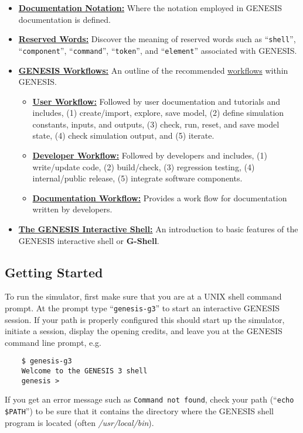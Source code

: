 \documentclass[12pt]{article}
\begin{document}
\begin{itemize}

\item \href{../document-notation/document-notation.tex}{\bf Documentation Notation:} Where the notation employed in GENESIS documentation is defined.

\item \href{../reserved-words/reserved-words.tex}{\bf Reserved Words:} Discover the meaning of reserved words such as ``{\tt shell}'', ``{\tt component}'', ``{\tt command}'', ``{\tt token}'', and ``{\tt element}'' associated with GENESIS.

\item \href{../workflow-intro/workflow-intro.tex}{\bf GENESIS Workflows:} An outline of the recommended \href{http://en.wikipedia.org/wiki/Workflow}{workflows} within GENESIS.
\begin{itemize}
\item \href{../workflow-user/workflow-user.tex}{\bf User Workflow:} Followed by user documentation and tutorials and includes, (1) create/import, explore, save model, (2) define simulation constants, inputs, and outputs, (3) check, run, reset, and save model state, (4) check simulation output, and (5) iterate.
\item \href{../workflow-developer/workflow-developer.tex}{\bf Developer Workflow:} Followed by developers and includes, (1) write/update code, (2) build/check, (3) regression testing, (4) internal/public release, (5) integrate software components.
\item \href{../workflow-documentation/workflow-documentation.tex}{\bf Documentation Workflow:} Provides a work flow for documentation written by developers.
\end{itemize}

\item \href{../gshell/gshell.tex}{\bf The GENESIS Interactive Shell:} An introduction to basic features of the GENESIS interactive shell or {\bf G-Shell}.

\end{itemize}

\subsection*{Getting Started}

To run the simulator, first make sure that you are at a UNIX shell command prompt. At the prompt type ``{\tt genesis-g3}'' to start an interactive GENESIS session. If your path is properly configured this should start up the simulator, initiate a session, display the opening credits, and leave you at the GENESIS command line prompt, e.g.
\begin{verbatim}
    $ genesis-g3
    Welcome to the GENESIS 3 shell
    genesis >
\end{verbatim}
If you get an error message such as {\tt Command not found}, check your path (``{\tt echo \$PATH}'') to be sure that it contains the directory where the GENESIS shell program is located (often {\it /usr/local/bin}).
\end{document}
